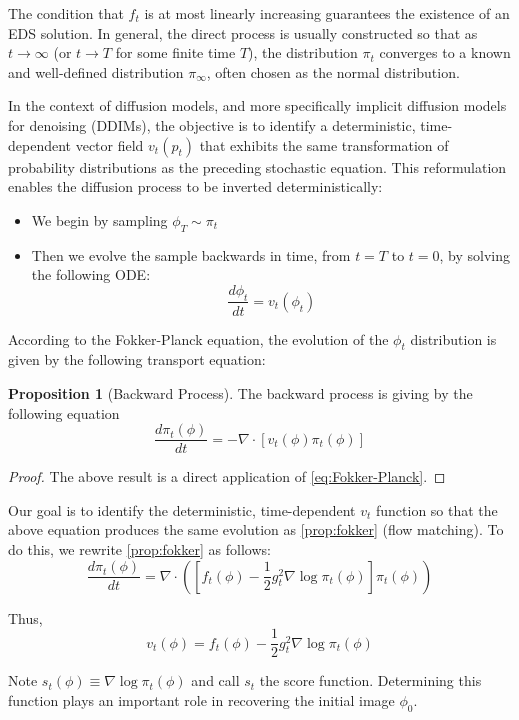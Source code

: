 \documentclass[a4paper,10pt]{article}
\theoremstyle{definition} %
\theoremstyle{definition} %
\newtheorem{proposition}[definition]{Proposition}
\theoremstyle{definition} %
\theoremstyle{definition} %
\begin{document}
The condition that $f_t$ is at most linearly increasing guarantees the existence of an EDS solution.
In general, the direct process is usually constructed so that as $t \rightarrow \infty$ (or $t \rightarrow T$ for some finite time $T$), the distribution $\pi_t$ converges to a known and well-defined distribution $\pi_{\infty}$, often chosen as the normal distribution.


In the context of diffusion models, and more specifically implicit diffusion models for denoising (DDIMs), the objective is to identify a deterministic, time-dependent vector field $v_t(p_t)$ that exhibits the same transformation of probability distributions as the preceding stochastic equation. This reformulation enables the diffusion process to be inverted deterministically:
\begin{itemize}
    \item We begin by sampling $\phi_T \sim \pi_t$
    \item Then we evolve the sample backwards in time, from $t=T$ to $t = 0$, by solving the following ODE:
    \begin{equation}
        \frac{d\phi_t}{dt} = v_t(\phi_t)
    \end{equation}
\end{itemize}

According to the Fokker-Planck equation, the evolution of the $\phi_t$ distribution is given by the following transport equation:
\begin{proposition}[Backward Process\label{prop:fokker}] 
The backward process is giving by the following equation
\[\frac{d\pi_t(\phi)}{dt} =-\nabla \cdot [v_t(\phi)\pi_t(\phi)]\]
\end{proposition}
\begin{proof}
    The above result is a direct application of \cref{eq:Fokker-Planck}.
\end{proof}

Our goal is to identify the deterministic, time-dependent $v_t$ function so that the above equation produces the same evolution as \eqref{prop:fokker} (flow matching). To do this, we rewrite \eqref{prop:fokker} as follows:
\[\frac{d\pi_t(\phi)}{dt} =\nabla \cdot([f_t(\phi)-\frac{1}{2}g_t^2\nabla \log\pi_t(\phi)]\pi_t(\phi))\]

Thus,
\[v_t(\phi) =f_t(\phi)-\frac{1}{2}g_t^2\nabla \log\pi_t(\phi) \]


Note $s_t(\phi) \equiv \nabla \log\pi_t(\phi)$ and call $s_t$ the score function. Determining this function plays an important role in recovering the initial image $\phi_0$.
\end{document}
